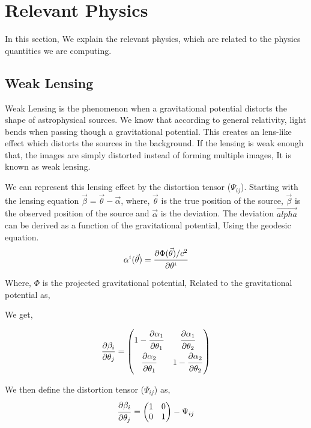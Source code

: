 \chapter{Relevant Physics}
\label{relevantphysics}
In this section, We explain the relevant physics, which are related to the physics quantities we are computing.
\section{Weak Lensing}
Weak Lensing is the phenomenon when a gravitational potential distorts the shape of astrophysical sources. We know that
according to general relativity, light bends when passing though a gravitational potential. This creates an lens-like effect
which distorts the sources in the background. If the lensing is weak enough that, the images are simply distorted instead of forming
multiple images, It is known as weak lensing. 

We can represent this lensing effect by the distortion tensor ($\Psi_{ij}$).
Starting with the lensing equation $\vec{\beta} = \vec{\theta} - \vec{\alpha}$, where, $\vec{\theta}$ is the true position of the
source, $\vec{\beta}$ is the observed position of the source and $\vec{\alpha}$ is the deviation.
The deviation $\vec{alpha}$ can be derived as a function of the gravitational potential, Using the geodesic equation.
\begin{align}
  \begin{split}
    \alpha^i ( \vec{\theta}) = \dfrac{\strut \partial \Phi(\vec{\theta})/c^2}{\strut \partial \theta^i}
  \end{split}
\end{align}
Where, $\Phi$ is the projected gravitational potential, Related to the gravitational potential as,

We get,

\begin{align}
  \label{derbeta}
  \begin{split}
    \frac{\partial \beta_i}{\partial \theta_j} =
    \begin{pmatrix}
      1 - \dfrac{\strut \partial \alpha_1}{\strut \partial \theta_1}& \dfrac{\strut \partial \alpha_1}{\strut \partial \theta_2} \\
       \dfrac{\strut \partial \alpha_2}{\strut \partial \theta_1}& 1 - \dfrac{\strut \partial \alpha_2}{\strut \partial \theta_2}\\
    \end{pmatrix}
  \end{split}
\end{align}

We then define the distortion tensor ($\Psi_{ij}$) as,
\begin{align}
  \begin{split}
    \dfrac{\strut \partial \beta_i}{\strut \partial \theta_j} =
    \begin{pmatrix}
      1 & 0 \\
      0 & 1\\
    \end{pmatrix}
     - \Psi_{ij}
  \end{split}
\end{align}

